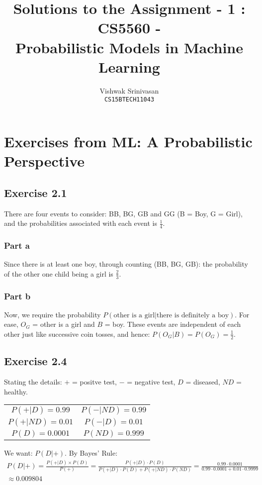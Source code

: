 \documentclass{article}
\title{Solutions to the Assignment - 1 : CS5560 - \\
Probabilistic Models in Machine Learning}
\author{Vishwak Srinivasan\\
\texttt{CS15BTECH11043}}
\date{}
\begin{document}
\maketitle

\section*{Exercises from ML: A Probabilistic Perspective}
\subsection*{Exercise 2.1}
\begin{flushleft}
There are four events to consider: BB, BG, GB and GG (B = Boy, G = Girl), and the probabilities associated with each event is \(\frac{1}{4}\).
\subsubsection*{Part a}
Since there is at least one boy, through counting (BB, BG, GB): the probability of the other one child being a girl is \(\frac{2}{3}\).

\subsubsection*{Part b}
Now, we require the probability \(P(\text{other is a girl} | \text{there is definitely a boy})\). For ease, \(O_{G}\) = other is a girl and \(B\) = boy. These events are independent of each other just like successive coin tosses, and hence: \(P(O_{G} | B) = P(O_{G}) = \frac{1}{2}\).
\end{flushleft}

\subsection*{Exercise 2.4}
\begin{flushleft}
Stating the details: \(+\) = positve test, \(-\) = negative test, \(D\) = diseased, \(ND\) = healthy.
\begin{center}
\begin{tabular}{cc}
\(P(+ | D) = 0.99\) & \(P(- | ND) = 0.99\) \\
\(P(+ | ND) = 0.01\) & \(P(- | D) = 0.01\) \\
\(P(D) = 0.0001\) & \(P(ND) = 0.999\)
\end{tabular}
\end{center}
We want: \(P(D | +)\). By Bayes' Rule:
\begin{multline}
P(D | +) = \frac{P(+ | D) \times P(D)}{P(+)} = \frac{P(+ | D) \cdot P(D)}{P(+ | D) \cdot P(D) + P(+ | ND) \cdot P(ND)} = \frac{0.99 \cdot 0.0001}{0.99 \cdot 0.0001 + 0.01 \cdot 0.9999}\\ \approx 0.009804
\end{multline}
\end{flushleft}
\end{document}
